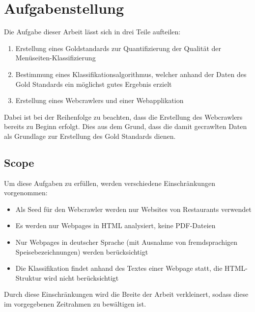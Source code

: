 \chapter{Aufgabenstellung}
Die Aufgabe dieser Arbeit lässt sich in drei Teile aufteilen:
\begin{enumerate}
	\item Erstellung eines Goldstandards zur Quantifizierung der Qualität der Menüseiten-Klassifizierung
	\item Bestimmung eines Klassifikationsalgorithmus, welcher anhand der Daten des Gold Standards ein möglichst gutes Ergebnis erzielt
	\item Erstellung eines Webcrawlers und einer Webapplikation
\end{enumerate}
Dabei ist bei der Reihenfolge zu beachten, dass die Erstellung des Webcrawlers bereits zu Beginn erfolgt.
Dies aus dem Grund, dass die damit gecrawlten Daten als Grundlage zur Erstellung des Gold Standards dienen.
\section{Scope}
Um diese Aufgaben zu erfüllen, werden verschiedene Einschränkungen vorgenommen:
\begin{itemize}
	\item Als Seed für den Webcrawler werden nur Websites von Restaurants verwendet
	\item Es werden nur Webpages in HTML analysiert, keine PDF-Dateien
	\item Nur Webpages in deutscher Sprache (mit Ausnahme von fremdsprachigen Speisebezeichnungen) werden berücksichtigt
	\item Die Klassifikation findet anhand des Textes einer Webpage statt, die HTML-Struktur wird nicht berücksichtigt
\end{itemize}
Durch diese Einschränkungen wird die Breite der Arbeit verkleinert, sodass diese im vorgegebenen Zeitrahmen zu bewältigen ist.